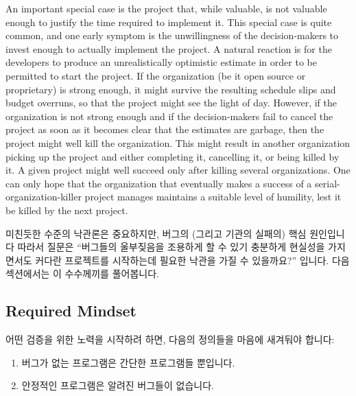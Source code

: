An important special case is the project that, while valuable, is not
valuable enough to justify the time required to implement it.
This special case is quite common, and one early symptom is the
unwillingness of the decision-makers to invest enough to actually
implement the project.
A natural reaction is for the developers to produce an unrealistically
optimistic estimate in order to be permitted to start the project.
If the organization (be it open source or proprietary) is strong enough,
it might survive the resulting schedule slips and budget overruns,
so that the project might see the light of day.
However, if the organization is not strong enough and if the decision-makers
fail to cancel the project as soon as it becomes clear that the estimates
are garbage, then the project might well kill the organization.
This might result in another organization picking up the project and
either completing it, cancelling it, or being killed by it.
A given project might well succeed only after killing several
organizations.
One can only hope that the organization that eventually makes a success
of a serial-organization-killer project manages maintains a suitable
level of humility, lest it be killed by the next project.
\fi

미친듯한 수준의 낙관론은 중요하지만, 버그의 (그리고 기관의 실패의) 핵심
원인입니다
따라서 질문은 ``버그들의 울부짖음을 조용하게 할 수 있기 충분하게 현실성을
가지면서도 커다란 프로젝트를 시작하는데 필요한 낙관을 가질 수 있을까요?''
입니다.
다음 섹션에서는 이 수수께끼를 풀어봅니다.

\subsection{Required Mindset}
\label{sec:debugging:Required Mindset}

어떤 검증을 위한 노력을 시작하려 하면, 다음의 정의들을 마음에 새겨둬야 합니다:

\begin{enumerate}
\item	버그가 없는 프로그램은 간단한 프로그램들 뿐입니다.
\item	안정적인 프로그램은 알려진 버그들이 없습니다.

\end{enumerate}

